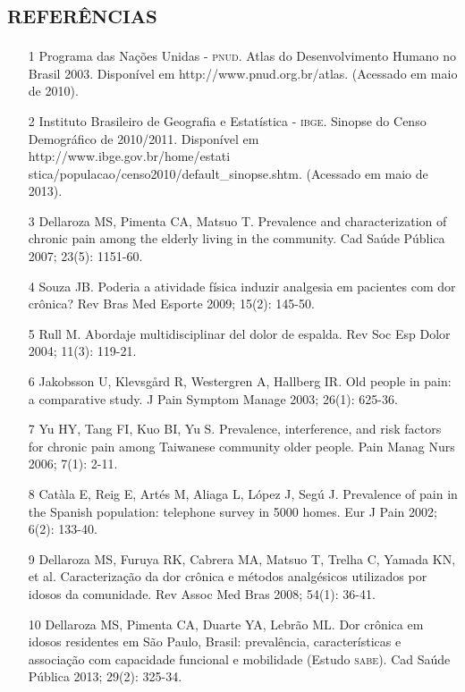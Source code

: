 \documentclass{article}
\begin{document}
\section*{\textsc{referências}}
\begin{itemize}

\item[1] Programa das Nações Unidas - \textsc{pnud}. Atlas do Desenvolvimento Humano
no Brasil 2003. Disponível em http://www.pnud.org.br/atlas. (Acessado em maio de
2010).

\item[2] Instituto Brasileiro de Geografia e Estatística - \textsc{ibge}. Sinopse do
Censo Demográfico de 2010/2011. Disponível em http://www.ibge.gov.br/home/estati
stica/populacao/censo2010/default\_{}sinopse.shtm. (Acessado em maio de 2013).

\item[3] Dellaroza MS, Pimenta CA, Matsuo T. Prevalence and characterization
of chronic pain among the elderly living in the community. Cad Saúde Pública
2007; 23(5): 1151-60.

\item[4] Souza JB. Poderia a atividade física induzir analgesia em pacientes
com dor crônica? Rev Bras Med Esporte 2009; 15(2): 145-50.

\item[5] Rull M. Abordaje multidisciplinar del dolor de espalda. Rev Soc Esp
Dolor 2004; 11(3): 119-21.

\item[6] Jakobsson U, Klevsgård R, Westergren A, Hallberg IR. Old people in
pain: a comparative study. J Pain Symptom Manage 2003; 26(1): 625-36.

\item[7] Yu HY, Tang FI, Kuo BI, Yu S. Prevalence, interference, and risk
factors for chronic pain among Taiwanese community older people. Pain Manag Nurs
2006; 7(1): 2-11.

\item[8] Catàla E, Reig E, Artés M, Aliaga L, López J, Segú J. Prevalence of
pain in the Spanish population: telephone survey in 5000 homes. Eur J Pain 2002;
6(2): 133-40.

\item[9] Dellaroza MS, Furuya RK, Cabrera MA, Matsuo T, Trelha C, Yamada KN,
et al. Caracterização da dor crônica e métodos analgésicos utilizados por idosos
da comunidade. Rev Assoc Med Bras 2008; 54(1): 36-41.

\item[10] Dellaroza MS, Pimenta CA, Duarte YA, Lebrão ML. Dor crônica em
idosos residentes em São Paulo, Brasil: prevalência, características e
associação com capacidade funcional e mobilidade (Estudo \textsc{sabe}). Cad Saúde
Pública 2013; 29(2): 325-34.


\end{itemize}
\end{document}

